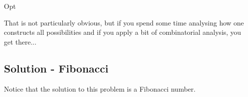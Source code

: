 \begin{algorithm}[H]
    \caption{Opt}
    \label{stairway-to-heaven:algorithm:opt}
    \begin{algorithmic}[1]
    \end{algorithmic}
\end{algorithm}

That is not particularly obvious, but if you spend some time analysing how one constructs all possibilities and if you apply a bit of combinatorial analysis, you get there...

\subsection{Solution - Fibonacci}

Notice that the solution to this problem is a Fibonacci number.
